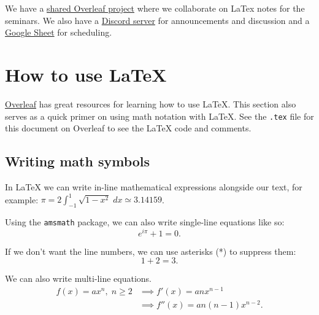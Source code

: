 \documentclass{article}[12pt]
\begin{document}
        
        We have a \href{https://www.overleaf.com/4797466783cszvmfmgsbct}{shared Overleaf project} where we collaborate on LaTex notes for the seminars. We also have a \href{https://discord.gg/Atv2jfRZnx}{Discord server} for announcements and discussion and a \href{https://docs.google.com/spreadsheets/d/1Ge9dVUt8bkdbZr03XvqzWJXrUtmdrix6Oo6ylrGNNsM/edit?usp=sharing}{Google Sheet} for scheduling.
    
    \section{How to use LaTeX}
        
        \href{https://www.overleaf.com/learn/latex/Learn_LaTeX_in_30_minutes}{Overleaf} has great resources for learning how to use \LaTeX. This section also serves as a quick primer on using math notation with LaTeX. See the \texttt{.tex} file for this document on Overleaf to see the LaTeX code and comments. %
    
    \subsection{Writing math symbols}
        
        In LaTeX we can write in-line mathematical expressions alongside our text, for example: $\pi = 2\int_{-1}^{1}\sqrt{1 - x^2} \; dx \simeq 3.14159 $. \newline
        
        Using the \texttt{amsmath} package, we can also write single-line equations like so:
        \begin{equation}
            e^{i\pi} + 1 = 0.
        \end{equation}
        
        If we don't want the line numbers, we can use asterisks (*) to suppress them:
        \begin{equation*}
            1 + 2 = 3.
        \end{equation*}
    
        We can also write multi-line equations.
        \begin{align}
            f(x) = a x^n, \; n \ge 2
            &\implies
            f'(x) = a n x^{n-1} \\  
            &\implies
            f''(x) = a n (n-1) x^{n-2}.
        \end{align}
        
\end{document}

